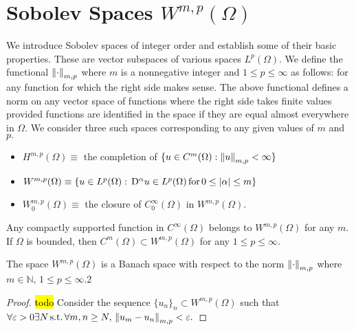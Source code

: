 \section{Sobolev Spaces $W^{m,p}(\Omega)$}
We introduce Sobolev spaces of integer order and establish some of their basic properties. These are vector subspaces of various spaces $L^p(\Omega).$ We define the functional $\norm{\cdot}_{m,p}$ where $m$ is a nonnegative integer and $1\leq p\leq \infty$ as follows:
for any function for which the right side makes sense. The above functional defines a norm on any vector space of functions where the right side takes finite values provided functions are identified in the space if they are equal almost everywhere in $\Omega.$ We consider three such spaces corresponding to any given values of $m$ and $p.$
\begin{itemize}
    \item $H^{m,p}(\Omega)\equiv$ the completion of $\{u\in C^m(\Omega):\norm{u}_{m,p}<\infty\}$
    \item $W^{m,p}(\Omega)\equiv\{u\in L^p(\Omega):\,\mathrm{D}^\alpha u\in L^p(\Omega)\,\mathrm{for}\,0\leq\abs{\alpha}\leq m\}$
    \item $W_0^{m,p}(\Omega)\equiv$ the closure of $C_0^\infty(\Omega)$ in $W^{m,p}(\Omega).$
\end{itemize}
Any compactly supported function in $C^\infty(\Omega)$ belongs to $W^{m,p}(\Omega)$ for any $m.$ If $\Omega$ is bounded, then $C^{m}(\Omega)\subset W^{m,p}(\Omega)$ for any $1\leq p\leq\infty.$
\begin{theorem}
    The space $W^{m,p}(\Omega)$ is a Banach space with respect to the norm $\norm{\cdot}_{m,p}$ where $m\in\mathbb{N},\,1\leq p\leq\infty.$2
\end{theorem}
\begin{proof}
    \hl{todo}
    Consider the sequence $\{u_n\}_n\subset W^{m,p}(\Omega)$ such that $\forall\varepsilon>0\exists N\,\mathrm{s.t.}\,\forall m,n\geq N,\,\norm{u_m-u_n}_{m,p}<\varepsilon.$
\end{proof}


